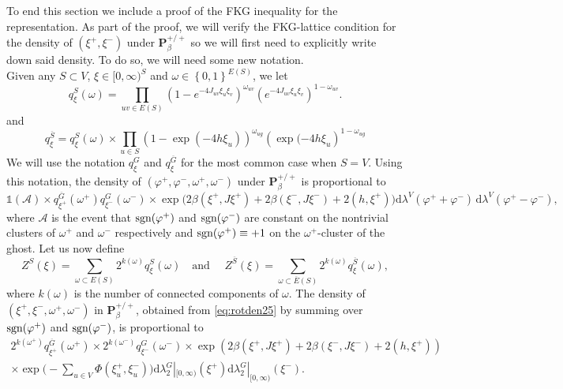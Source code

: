 \documentclass{article}
\numberwithin{equation}{section}
\theoremstyle{definition}
\theoremstyle{definition}
\theoremstyle{remark}
\DeclareMathOperator{\sgn}{\textnormal{sgn}}
\renewcommand{\d}{\mathrm{d}}
\newcommand\vp{\varphi}
\renewcommand{\d}{\mathrm{d}}
\newcommand{\w}{\omega}
\renewcommand{\l}{\lambda}
\newcommand{\vpp}{\vp^+}
\newcommand{\vpm}{\vp^-}
\newcommand{\I}{\Phi}
\renewcommand{\P}{\mathrm{\mathbf{P}}}
\renewcommand{\L}{\xi}
\renewcommand{\i}{\mathds{1}}
\begin{document}
\noindent To end this section we include a proof of the FKG inequality for the representation. As part of the proof, we will verify the FKG-lattice condition for the density of $(\L^+,\L^-)$ under $\P^{+ / +}_{\beta}$ so we will first need to explicitly write down said density. To do so, we will need some new notation.
\\[1em]
\noindent Given any $S \subset V$, $\L \in [0,\infty)^S$ and $\w \in \left\{ 0,1 \right\}^{E(S)}$, we let
\begin{equation}\label{eq:qdef}
	q^S_{\L}(\w) = \prod_{uv \in E(S)} (1 - e^{-4J_{uv}\L_u\L_v})^{\w_{uv}} ( e^{-4J_{uv} \L_u \L_v})^{1-\w_{uv}}.
\end{equation}
and 
\begin{equation}\label{eq:qbardef}
	q_\L^{ \overline{S}} = q_\L^{S}(\w) \times \prod_{u \in S} \left( 1 - \exp(-4 h \L_u) \right)^{\w_{ug}} \left( \exp( - 4 h \L_u \right)^{1 - \w_{ug}}
\end{equation}
We will use the notation $q^G_{\L}$ and $q^{ \overline{G}}_{\L}$ for the most common case when $S = V$.
Using this notation, the density of $(\vpp,\vpm,\w^+,\w^-)$ under $\P_{\beta}^{+ / +}$ is proportional to
\begin{equation}\label{eq:rotden25}
	\i(\mathcal{A}) \times q^{ \overline{G}}_{\L^+}(\w^+) q^G_{\L^-}(\w^-) 
	\times \exp\big( 2\beta (\L^+,J\L^+) + 2\beta(\L^-, J\L^-) + 2(h,\L^+)\big) \d\l^V(\vpp + \vpm)\, \d\l^V(\vpp - \vpm),
\end{equation} 
where $\mathcal{A}$ is the event that $\sgn(\vpp)$ and $\sgn(\vpm)$ are constant on the nontrivial clusters of $\w^+$ and $\w^-$ respectively and $\sgn(\vpp) \equiv +1$ on the $\w^+$-cluster of the ghost.  
Let us now define
\begin{equation}\label{eq:Zdef}
	Z^S(\L) = \sum_{\w \subset E(S)} 2^{k(\w)} q^S_{\L}(\w) \quad \text{and }\quad Z^{ \overline{S}}(\L) = \sum_{ \w \subset \overline{E}(S)} 2^{k(\w)} q^{ \overline{S}}_{\L}(\w),
\end{equation} 
where $k(\w)$ is the number of connected components of $\w$.
The density of $(\L^+,\L^-,\w^+,\w^-)$ in $\P_{\beta}^{+ / +}$, obtained from \eqref{eq:rotden25} by summing over $\sgn(\vpp)$ and $\sgn(\vpm)$, is proportional to
\begin{multline}\label{eq:rotden3}
	2^{k(\w^+)} q_{\L^+}^{ \overline{G}}(\w^+) \times 2^{k(\w^-)} q_{\L^-}^G(\w^-) \times \exp(2\beta(\L^+,J\L^+) + 2\beta(\L^-,J\L^-) + 2(h,\L^+)) \\ \times \exp\Big(-\textstyle\sum_{u \in V}\I(\L^+_u,\L^-_u) \Big) \d\l_2^G|_{[0,\infty)}(\L^+) \d\l_2^G|_{[0,\infty)}(\L^-).
\end{multline}
\end{document}
